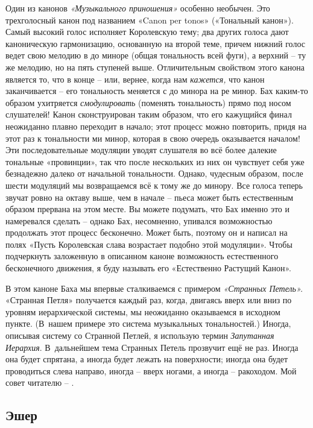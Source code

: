 \documentclass[../main.tex]{subfiles}
\begin{document}
Один из канонов \emph{«Музыкального приношения»} особенно необычен. Это трехголосный канон под названием «Canon per tonos» («Тональный канон»). Самый высокий голос исполняет Королевскую тему; два других голоса дают каноническую гармонизацию, основанную на второй теме, причем нижний голос ведет свою мелодию в до миноре (общая тональность всей фуги), а верхний \--- ту же мелодию, но на пять ступеней выше. Отличительным свойством этого канона является то, что в конце \--- или, вернее, когда нам \emph{кажется,} что канон заканчивается \--- его тональность меняется с до минора на ре минор. Бах каким-то образом ухитряется \emph{смодулировать} (поменять тональность) прямо под носом слушателей! Канон сконструирован таким образом, что его кажущийся финал неожиданно плавно переходит в начало; этот процесс можно повторить, придя на этот раз к тональности ми минор, которая в свою очередь оказывается началом! Эти последовательные модуляции уводят слушателя во всё более далекие тональные «провинции», так что после нескольких из них он чувствует себя уже безнадежно далеко от начальной тональности. Однако, чудесным образом, после шести модуляций мы возвращаемся всё к тому же до минору. Все голоса теперь звучат ровно на октаву выше, чем в начале \--- пьеса может быть естественным образом прервана на этом месте. Вы можете подумать, что Бах именно это и намеревался сделать \--- однако Бах, несомненно, упивался возможностью продолжать этот процесс бесконечно. Может быть, поэтому он и написал на полях «Пусть Королевская слава возрастает подобно этой модуляции». Чтобы подчеркнуть заложенную в описанном каноне возможность естественного бесконечного движения, я буду называть его «Естественно Растущий Канон».

В этом каноне Баха мы впервые сталкиваемся с примером \emph{«Странных Петель».} «Странная Петля» получается каждый раз, когда, двигаясь вверх или вниз по уровням иерархической системы, мы неожиданно оказываемся в исходном пункте. (В~нашем примере это система музыкальных тональностей.) Иногда, описывая систему со Странной Петлей, я использую термин \emph{Запутанная Иерархия}. В~дальнейшем тема Странных Петель прозвучит ещё не раз. Иногда она будет спрятана, а иногда будет лежать на поверхности; иногда она будет проводиться слева направо, иногда \--- вверх ногами, а иногда \--- ракоходом. Мой совет читателю \--- .


\subsection{Эшер}
\end{document}
